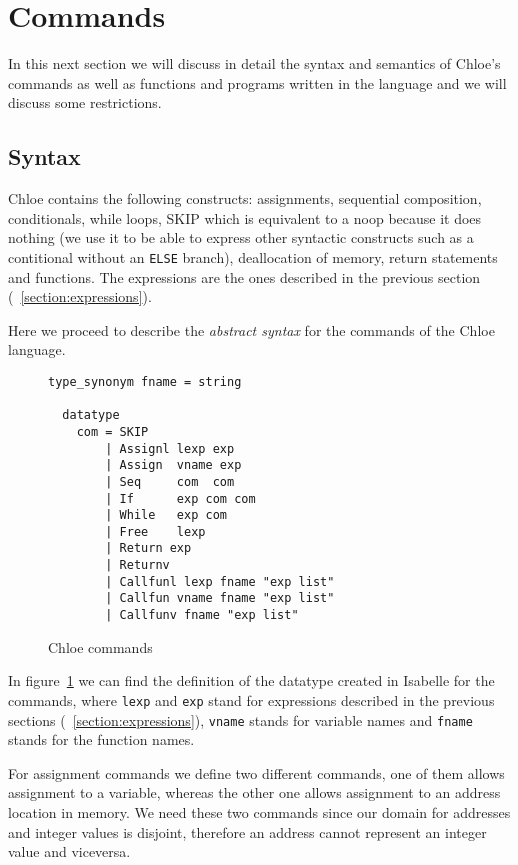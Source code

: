 \section{Commands}\label{section:commands}

In this next section we will discuss in detail the syntax and semantics of Chloe's commands as well as functions and programs written in the language and we will discuss some restrictions.

\subsection{Syntax}\label{subsection:syntax_commands}

Chloe contains the following constructs: assignments, sequential composition, conditionals, while loops, SKIP which is equivalent to a noop because it does nothing (we use it to be able to express other syntactic constructs such as a contitional without an \verb|ELSE| branch), deallocation of memory, return statements and functions.
The expressions are the ones described in the previous section (~\ref{section:expressions}).

Here we proceed to describe the \textit{abstract syntax} for the commands of the Chloe language.

\begin{figure}
  \begin{lstlisting}[frame=single, mathescape=true]
  type_synonym fname = string

  datatype
    com = SKIP
        | Assignl lexp exp
        | Assign  vname exp
        | Seq     com  com
        | If      exp com com
        | While   exp com
        | Free    lexp
        | Return exp
        | Returnv
        | Callfunl lexp fname "exp list"
        | Callfun vname fname "exp list"
        | Callfunv fname "exp list"
  \end{lstlisting}

  \caption{Chloe commands}
  \label{fig:chloe_commands}
\end{figure}

In figure~\ref{fig:chloe_commands} we can find the definition of the datatype created in Isabelle for the commands, where \verb|lexp| and \verb|exp| stand for expressions described in the previous sections (~\ref{section:expressions}), \verb|vname| stands for variable names and \verb|fname| stands for the function names.

For assignment commands we define two different commands, one of them allows assignment to a variable, whereas the other one allows assignment to an address location in memory.
We need these two commands since our domain for addresses and integer values is disjoint, therefore an address cannot represent an integer value and viceversa.

